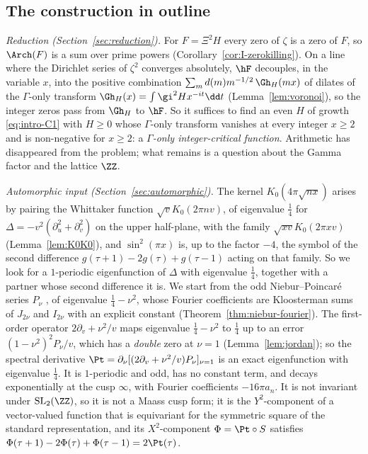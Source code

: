 \subsection{The construction in outline}

\emph{Reduction (Section~\ref{sec:reduction}).} For $F=\Xi^2H$ every zero of $\zeta$ is a zero of $F$, so $\Arch(F)$ is a sum over prime
powers (Corollary~\ref{cor:I-zerokilling}). On a line where the Dirichlet series of $\zeta^2$ converges absolutely, $\hF$ decouples, in the
variable $x$, into the positive combination $\sum_md(m)m^{-1/2}\,\Gh_H(mx)$ of dilates of the $\Gamma$-only transform
$\Gh_H(x)=\int\gi^2Hx^{-it}\dd t$ (Lemma~\ref{lem:voronoi}), so the integer zeros pass from $\Gh_H$ to $\hF$. So it suffices to find an even
$H$ of growth \eqref{eq:intro-C1} with $H\ge0$ whose $\Gamma$-only transform vanishes at every integer $x\ge2$ and is non-negative for
$x\ge2$: a \emph{$\Gamma$-only integer-critical function}. Arithmetic has disappeared from the problem; what remains is a question about the
Gamma factor and the lattice $\ZZ$.

\emph{Automorphic input (Section~\ref{sec:automorphic}).} The kernel $K_0(4\pi\sqrt{nx})$ arises by pairing the Whittaker function
$\sqrt vK_0(2\pi nv)$, of eigenvalue $\frac14$ for $\Delta=-v^2(\partial_u^2+\partial_v^2)$ on the upper half-plane, with the family
$\sqrt{xv}K_0(2\pi xv)$ (Lemma~\ref{lem:K0K0}), and $\sin^2(\pi x)$ is, up to the factor $-4$, the symbol of the second difference
$g(\tau+1)-2g(\tau)+g(\tau-1)$ acting on that family. So we look for a $1$-periodic eigenfunction of $\Delta$ with eigenvalue $\frac14$,
together with a partner whose second difference it is. We start from the odd Niebur--Poincar\'e series $P_\nu$ \cite{Nie73}, of eigenvalue $\frac14-\nu^2$,
whose Fourier coefficients are Kloosterman sums of $J_{2\nu}$ and $I_{2\nu}$ with an explicit constant (Theorem~\ref{thm:niebur-fourier}). The
first-order operator $2\partial_v+\nu^2/v$ maps eigenvalue $\frac14-\nu^2$ to $\frac14$ up to an error $(1-\nu^2)^2P_\nu/v$, which has a
\emph{double} zero at $\nu=1$ (Lemma~\ref{lem:jordan}); so the spectral derivative $\Pt=\partial_\nu[(2\partial_v+\nu^2/v)P_\nu]_{\nu=1}$ is an exact
eigenfunction with eigenvalue $\frac14$. It is $1$-periodic and odd, has no constant term, and decays exponentially at the cusp $\infty$, with
Fourier coefficients $-16\pi a_n$. It is not invariant under $\mathrm{SL}_2(\ZZ)$, so it is not a Maass cusp form; it is
the $Y^2$-component of a vector-valued function that is equivariant for the symmetric square of the standard representation, and its
$X^2$-component $\Phi=\Pt\circ S$ satisfies $\Phi(\tau+1)-2\Phi(\tau)+\Phi(\tau-1)=2\Pt(\tau)$.

